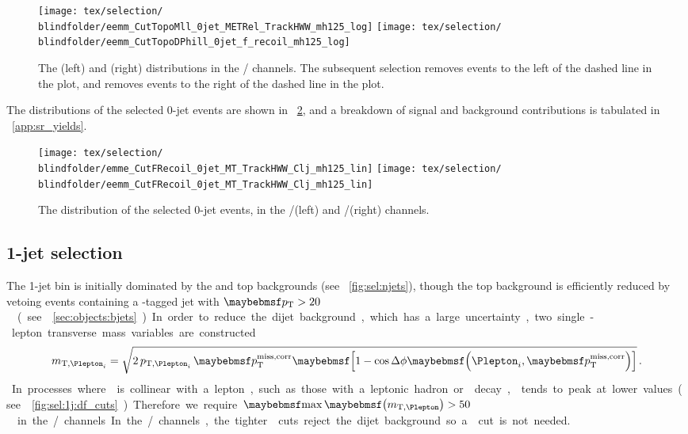 \begin{figure}
	\texttt{[image: tex/selection/\\blindfolder/eemm\_CutTopoMll\_0jet\_METRel\_TrackHWW\_mh125\_log]}
	\hfill
	\texttt{[image: tex/selection/\\blindfolder/eemm\_CutTopoDPhill\_0jet\_f\_recoil\_mh125\_log]}
	\caption{The \trackmetrel (left) and \frecoil (right) distributions in the \eech/\mmch 
	channels. The subsequent selection removes events to the left of the dashed line in the 
	\trackmetrel plot, and removes events to the right of the dashed line in the \frecoil 
	plot.}
	\label{fig:sel:0j:sf_cuts}
\end{figure}

The \mt distributions of the selected 0-jet events are shown in \Figure~\ref{fig:sel:0j:mt}, 
and a breakdown of signal and background contributions is tabulated in 
\Appendix~\ref{app:sr_yields}.

\begin{figure}
	\texttt{[image: tex/selection/\\blindfolder/emme\_CutFRecoil\_0jet\_MT\_TrackHWW\_Clj\_mh125\_lin]}
	\hfill
	\texttt{[image: tex/selection/\\blindfolder/eemm\_CutFRecoil\_0jet\_MT\_TrackHWW\_Clj\_mh125\_lin]}
	\caption{The \mt distribution of the selected 0-jet events, in the \emch/\mech (left) 
	and \eech/\mmch (right) channels.}
	\label{fig:sel:0j:mt}
\end{figure}



\subsection{1-jet selection}
\label{sec:selection:1j}

The 1-jet bin is initially dominated by the \DY and top backgrounds (see 
\Figure~\ref{fig:sel:njets}), though the top background is efficiently reduced by vetoing 
events containing a \Pbottom-tagged jet with \unit{$\pt > 20$}{\GeV} (see 
\Section~\ref{sec:objects:bjets}).

In order to reduce the dijet background, which has a large uncertainty, two single-lepton 
transverse mass variables are constructed
\begin{equation}
	m_{\text{T,}\Plepton_i} = \sqrt{2 \, p_{\text{T,}\Plepton_i} \, \corrtrackmet 
	\sqbracs{1 - \cos\Delta\phi\parenths{\Plepton_i, \corrtrackmet}}} \,.
\end{equation}
In processes where \corrtrackmetvec is collinear with a lepton, such as those with a 
leptonic hadron or \Ptau decay, \maxmtw tends to peak at lower values (see 
\Figure~\ref{fig:sel:1j:df_cuts}). Therefore we require \unit{$\maxmtw > 50$}{\GeV} in the 
\emch/\mech channels. In the \eech/\mmch channels, the tighter \met cuts reject the dijet 
background so a \maxmtw cut is not needed.

